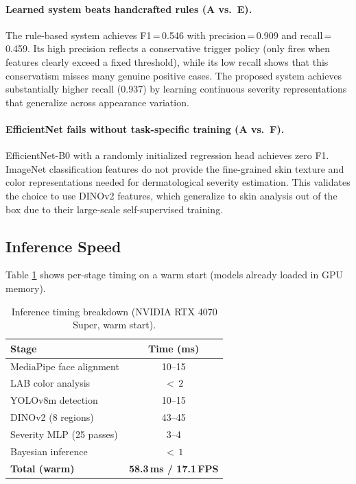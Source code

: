 \documentclass[journal]{IEEEtran}
\begin{document}
\paragraph{Learned system beats handcrafted rules (A vs.\ E).}
The rule-based system achieves F1\,=\,0.546 with precision\,=\,0.909 and
recall\,=\,0.459. Its high precision reflects a conservative trigger policy
(only fires when features clearly exceed a fixed threshold), while its low
recall shows that this conservatism misses many genuine positive cases.
The proposed system achieves substantially higher recall (0.937) by learning
continuous severity representations that generalize across appearance variation.

\paragraph{EfficientNet fails without task-specific training (A vs.\ F).}
EfficientNet-B0 \cite{tan2019} with a randomly initialized regression head
achieves zero F1. ImageNet classification features do not provide the fine-grained
skin texture and color representations needed for dermatological severity
estimation. This validates the choice to use DINOv2 features, which generalize
to skin analysis out of the box due to their large-scale self-supervised training.

\subsection{Inference Speed}

Table \ref{tab:speed} shows per-stage timing on a warm start (models already
loaded in GPU memory).

\begin{table}[h]
\centering
\caption{Inference timing breakdown (NVIDIA RTX 4070 Super, warm start).}
\label{tab:speed}
\begin{tabular}{lc}
\toprule
\textbf{Stage} & \textbf{Time (ms)} \\
\midrule
MediaPipe face alignment  & 10--15 \\
LAB color analysis        & $<\,2$ \\
YOLOv8m detection         & 10--15 \\
DINOv2 (8 regions)        & 43--45 \\
Severity MLP (25 passes)  & 3--4   \\
Bayesian inference        & $<\,1$ \\
\midrule
\textbf{Total (warm)}     & \textbf{58.3\,ms / 17.1\,FPS} \\
\bottomrule
\end{tabular}
\end{table}
\end{document}
